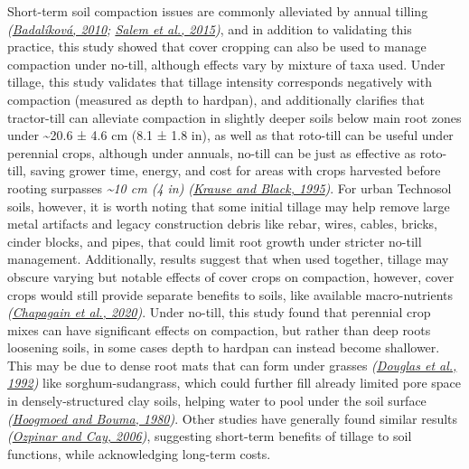 \documentclass[
  12pt,
]{article}
\begin{document}
Short-term soil compaction issues are commonly alleviated by annual tilling \emph{(\protect\hyperlink{ref-badalikova10}{Badalíková, 2010}; \protect\hyperlink{ref-salem15}{Salem et al., 2015})}, and in addition to validating this practice, this study showed that cover cropping can also be used to manage compaction under no-till, although effects vary by mixture of taxa used.
Under tillage, this study validates that tillage intensity corresponds negatively with compaction (measured as depth to hardpan), and additionally clarifies that tractor-till can alleviate compaction in slightly deeper soils below main root zones under
\textasciitilde20.6 ±
4.6 cm
(8.1 ±
1.8 in),
as well as that roto-till can be useful under perennial crops, although under annuals, no-till can be just as effective as roto-till, saving grower time, energy, and cost for areas with crops harvested before rooting surpasses \emph{\textasciitilde10 cm (4 in)} \emph{(\protect\hyperlink{ref-krause95}{Krause and Black, 1995})}.
For urban Technosol soils, however, it is worth noting that some initial tillage may help remove large metal artifacts and legacy construction debris like rebar, wires, cables, bricks, cinder blocks, and pipes, that could limit root growth under stricter no-till management.
Additionally, results suggest that when used together, tillage may obscure varying but notable effects of cover crops on compaction, however, cover crops would still provide separate benefits to soils, like available macro-nutrients \emph{(\protect\hyperlink{ref-chapagain20}{Chapagain et al., 2020})}.
Under no-till, this study found that perennial crop mixes can have significant effects on compaction, but rather than deep roots loosening soils, in some cases depth to hardpan can instead become shallower.
This may be due to dense root mats that can form under grasses \emph{(\protect\hyperlink{ref-douglas92}{Douglas et al., 1992})} like sorghum-sudangrass, which could further fill already limited pore space in densely-structured clay soils, helping water to pool under the soil surface \emph{(\protect\hyperlink{ref-hoogmoed80}{Hoogmoed and Bouma, 1980})}.
Other studies have generally found similar results \emph{(\protect\hyperlink{ref-ozpinar06}{Ozpinar and Cay, 2006})}, suggesting short-term benefits of tillage to soil functions, while acknowledging long-term costs.
\end{document}
